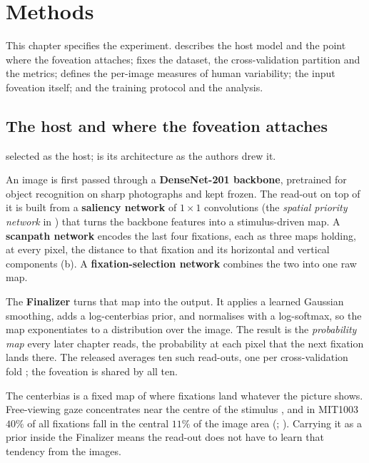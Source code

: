 \chapter{Methods}
\label{ch:methods}

This chapter specifies the experiment.  describes the host model and the point where
the foveation attaches;  fixes the dataset, the cross-validation partition and
the metrics;  defines the per-image measures of human variability;
 the input foveation itself; and  the training protocol and the
analysis.

\section{The host and where the foveation attaches}
\label{sec:dg3-arch}

 selected \dg{} as the host;  is its architecture as the
authors drew it.

An image is first passed through a \textbf{DenseNet-201 backbone}, pretrained for object recognition on
sharp photographs and kept frozen. The read-out on top of it is built from a \textbf{saliency
network} of $1\times1$ convolutions (the \emph{spatial priority network} in )
that turns the backbone features into a stimulus-driven map. A \textbf{scanpath network} encodes the last
four fixations, each as three maps holding, at every pixel, the distance to that fixation and its
horizontal and vertical components (b). A \textbf{fixation-selection network}
combines the two into one raw map.

The \textbf{Finalizer} turns that map into the output. It applies a learned Gaussian smoothing, adds a
log-centerbias prior, and normalises with a log-softmax, so the map exponentiates to a distribution over
the image. The result is the \emph{probability map} every later chapter reads, the probability at
each pixel that the next fixation lands there. The released \dg{} averages ten such read-outs, one per
cross-validation fold \citep{deepgazepytorch}; the foveation is shared by all ten.

The centerbias is a fixed map of where fixations land whatever the picture shows. Free-viewing gaze
concentrates near the centre of the stimulus \citep{tatler2007central}, and in MIT1003 $40\%$ of all
fixations fall in the central $11\%$ of the image area (;
\citealp{judd2009mit1003}). Carrying it as a prior inside the Finalizer means the read-out does not have
to learn that tendency from the images.

